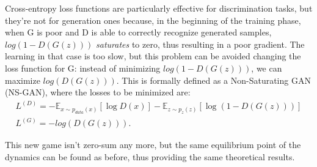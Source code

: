Cross-entropy loss functions are particularly effective for discrimination tasks, but they're not for generation ones because, in the beginning of the training phase, when G is poor and D is able to correctly recognize generated samples, $log(1-D(G(z)))$ \textit{saturates} to zero, thus resulting in a poor gradient. The learning in that case is too slow, but this problem can be avoided changing the loss function for G: instead of minimizing $log(1-D(G(z)))$, we can maximize $log(D(G(z)))$. This is formally defined as a Non-Saturating GAN (NS-GAN), where the losses to be minimized are:
\begin{align*}
L^{(D)} = -\mathbb{E}_{x \sim p_{data}(x)}[\log D(x)] - \mathbb{E}_{z \sim p_{z}(z)}[\log (1-D(G(z)))]\\
L^{(G)} = - log(D(G(z))).
\end{align*}

This new game isn't zero-sum any more, but the same equilibrium point of the dynamics can be found as before, thus providing the same theoretical results.

